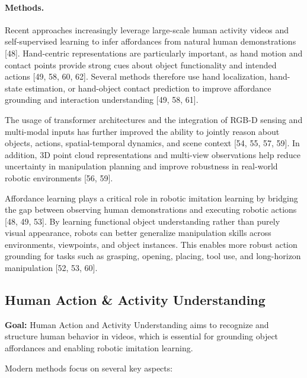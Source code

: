 \paragraph{Methods.}
Recent approaches increasingly leverage large-scale human activity videos and self-supervised learning to infer affordances from natural human demonstrations [48]. Hand-centric representations are particularly important, as hand motion and contact points provide strong cues about object functionality and intended actions [49, 58, 60, 62]. Several methods therefore use hand localization, hand-state estimation, or hand-object contact prediction to improve affordance grounding and interaction understanding [49, 58, 61].

The usage of transformer architectures and the integration of RGB-D sensing and multi-modal inputs has further improved the ability to jointly reason about objects, actions, spatial-temporal dynamics, and scene context [54, 55, 57, 59]. In addition, 3D point cloud representations and multi-view observations help reduce uncertainty in manipulation planning and improve robustness in real-world robotic environments [56, 59].

Affordance learning plays a critical role in robotic imitation learning by bridging the gap between observing human demonstrations and executing robotic actions [48, 49, 53]. By learning functional object understanding rather than purely visual appearance, robots can better generalize manipulation skills across environments, viewpoints, and object instances. This enables more robust action grounding for tasks such as grasping, opening, placing, tool use, and long-horizon manipulation [52, 53, 60].



















\subsection{Human Action \& Activity Understanding}
\textbf{Goal:} Human Action and Activity Understanding aims to recognize and structure human behavior in videos, which is essential for grounding object affordances and enabling robotic imitation learning.

Modern methods focus on several key aspects:

